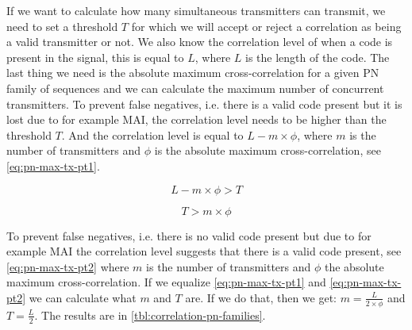 		If we want to calculate how many simultaneous transmitters can transmit, we need to set a threshold $T$ for which we will accept or reject a correlation as being a valid transmitter or not.
		We also know the correlation level of when a code is present in the signal, this is equal to $L$, where $L$ is the length of the code.
		The last thing we need is the absolute maximum cross-correlation for a given PN family of sequences and we can calculate the maximum number of concurrent transmitters.
		To prevent false negatives, i.e. there is a valid code present but it is lost due to for example MAI, the correlation level needs to be higher than the threshold $T$. 
		And the correlation level is equal to $L - m \times \phi$, where $m$ is the number of transmitters and $\phi$ is the absolute maximum cross-correlation, see \autoref{eq:pn-max-tx-pt1}.

		\begin{equation}
			\label{eq:pn-max-tx-pt1}
			L - m \times \phi > T
		\end{equation}

		\begin{equation}
			\label{eq:pn-max-tx-pt2}
			T > m \times \phi
		\end{equation}

		To prevent false negatives, i.e. there is no valid code present but due to for example MAI the correlation level suggests that there is a valid code present, see \autoref{eq:pn-max-tx-pt2} where $m$ is the number of transmitters and $\phi$ the absolute maximum cross-correlation.
		If we equalize \autoref{eq:pn-max-tx-pt1} and \autoref{eq:pn-max-tx-pt2} we can calculate what $m$ and $T$ are.
		If we do that, then we get: $m = \frac{L}{2 \times \phi}$ and $T = \frac{L}{2}$.
		The results are in \autoref{tbl:correlation-pn-families}.
		






